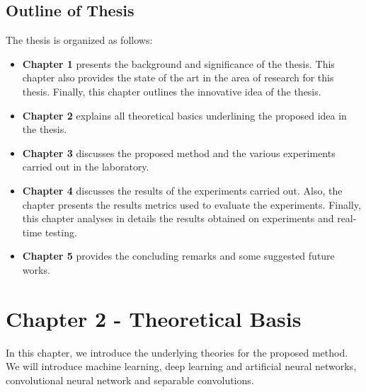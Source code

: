 \documentclass[master]{thesis-uestc}
\begin{document}
\section{Outline of Thesis}
The thesis is organized as follows:
\begin{itemize}
    \item \textbf{Chapter 1} presents the background and significance of the thesis. This chapter also provides the state of the art in the area of research for this thesis. Finally, this chapter outlines the innovative idea of the thesis.
    \item \textbf{Chapter 2} explains all theoretical basics underlining the proposed idea in the thesis.
    \item \textbf{Chapter 3} discusses the proposed method and the various experiments carried out in the laboratory.
    \item \textbf{Chapter 4} discusses the results of the experiments carried out. Also, the chapter presents the results metrics used to evaluate the experiments. Finally, this chapter analyses in details the results obtained on experiments and real-time testing.
    \item \textbf{Chapter 5} provides the concluding remarks and some suggested future works.
\end{itemize}


\chapter{Chapter 2 - Theoretical Basis}
In this chapter, we introduce the underlying theories for the proposed method. We will introduce machine learning, deep learning and artificial neural networks, convolutional neural network and separable convolutions.
\end{document}
